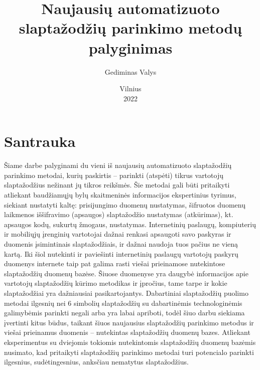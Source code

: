 \documentclass{VUMIFInfBakalaurinis}
\institute{Informatikos institutas}
\title{Naujausių automatizuoto slaptažodžių parinkimo metodų palyginimas}
\author{Gediminas Valys}
\date{Vilnius \\ 2022}
\begin{document}
\maketitle

\tableofcontents


\section{Santrauka}
Šiame darbe palyginami du vieni iš naujausių automatizuoto slaptažodžių 
parinkimo metodai, kurių paskirtis -- parinkti (atspėti) tikrus vartotojų 
slaptažodžius nežinant jų tikros reikšmės. Šie metodai gali būti pritaikyti 
atliekant baudžiamųjų bylų skaitmeninės informacijos ekspertinius tyrimus, 
siekiant nustatyti kaltę: prisijungimo duomenų nustatymas, šifruotos duomenų 
laikmenos iššifravimo (apsaugos) slaptažodžio nustatymas (atkūrimas), kt. 
apsaugos kodų, sukurtų žmogaus, nustatymas. Internetinių paslaugų, kompiuterių 
ir mobiliųjų įrenginių vartotojai dažnai renkasi apsaugoti savo paskyras ir 
duomenis įsimintinais slaptažodžiais, ir dažnai naudoja tuos pačius ne vieną 
kartą. Iki šiol nutekinti ir paviešinti internetinių paslaugų vartotojų paskyrų 
duomenys internete taip pat galima rasti viešai prieinamose nutekintose 
slaptažodžių duomenų bazėse. Šiuose duomenyse yra daugybė informacijos apie 
vartotojų slaptažodžių kūrimo metodikas ir įpročius, tame tarpe ir kokie 
slaptažodžiai yra dažniausiai pasikartojantys. Dabartiniai slaptažodžių puolimo 
metodai ilgesnių nei 6 simbolių slaptažodžių su dabartinėmis technologinėmis 
galimybėmis parinkti negali arba yra labai apriboti, todėl šiuo darbu siekiama 
įvertinti kitus būdus, taikant šiuos naujausius slaptažodžių parinkimo metodus 
ir viešai prieinamus duomenis -- nutekintas slaptažodžių duomenų bazes. 
Atliekant eksperimentus su dviejomis tokiomis nutekintomis slaptažodžių duomenų 
bazėmis nusimato, kad pritaikyti slaptažodžių parinkimo metodai turi potencialo 
parinkti ilgesnius, sudėtingesnius, anksčiau nematytus slaptažodžius.
\end{document}
